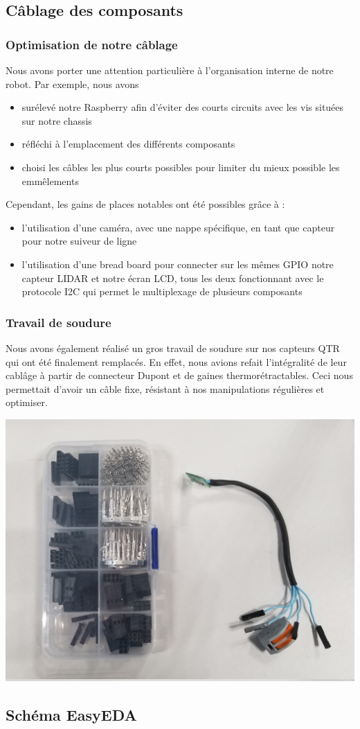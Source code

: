 \subsection{Câblage des composants}

\subsubsection*{Optimisation de notre câblage}
Nous avons porter une attention particulière à l'organisation interne de notre robot. Par exemple, nous avons 
\begin{itemize}
    \item surélevé notre Raspberry afin d'éviter des courts circuits avec les vis situées sur notre chassis
    \item réfléchi à l'emplacement des différents composants
    \item choisi les câbles les plus courts possibles pour limiter du mieux possible les emmêlements
\end{itemize}
Cependant, les gains de places notables ont été possibles grâce à :
\begin{itemize}
    \item l'utilisation d'une caméra, avec une nappe spécifique, en tant que capteur pour notre suiveur de ligne
    \item l'utilisation d'une bread board pour connecter sur les mêmes GPIO notre capteur LIDAR et notre écran LCD, tous les deux fonctionnant avec le protocole I2C qui permet le multiplexage de plusieurs composants
\end{itemize}

\subsubsection*{Travail de soudure}
Nous avons également réalisé un gros travail de soudure sur nos capteurs QTR qui ont été finalement remplacés. En effet, nous avions refait l'intégralité de leur cablâge à partir de connecteur Dupont et de gaines thermorétractables. Ceci nous permettait d'avoir un câble fixe, résistant à nos manipulations régulières et optimiser.

\includegraphics[scale=0.1]{../images/capteurQTR.jpg}

\subsection{Schéma EasyEDA}

\todo